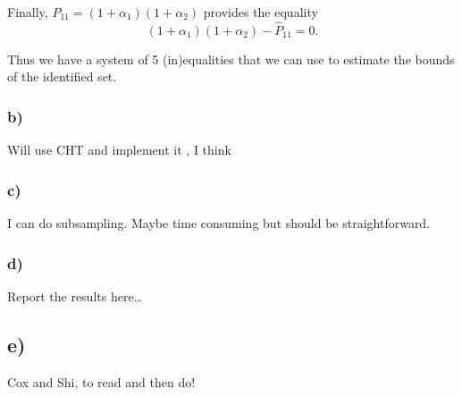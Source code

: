 \documentclass{article}
\begin{document}
Finally, $P_{11}=(1+\alpha_1)(1+\alpha_2)$ provides the equality
\[
(1+\alpha_1)(1+\alpha_2) - \hat P_{11} = 0.
\]

Thus we have a system of 5 (in)equalities that we can use to estimate the bounds of the identified set. 


\subsubsection*{b)}

Will use CHT and implement it , I think


\subsubsection*{c)}
I can do subsampling. Maybe time consuming but should be straightforward. 


\subsubsection*{d)}
Report the results here\dots


\subsection*{e)}
Cox and Shi, to read and then do!
\end{document}
